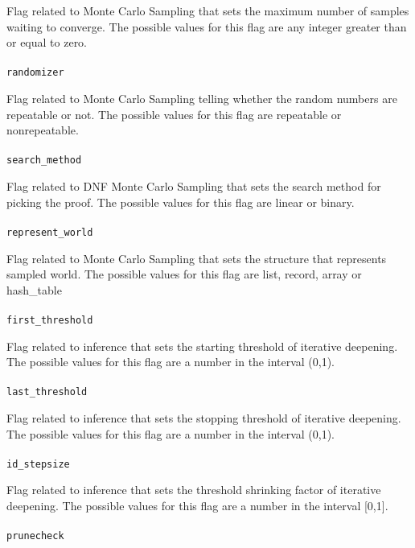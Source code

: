 \documentclass[a4paper,12pt]{article}
\begin{document}
Flag related to Monte Carlo Sampling that sets the maximum number of samples waiting to converge.
The possible values for this flag are any integer greater than or equal to zero.
\paragraph{}
\texttt{randomizer}

Flag related to Monte Carlo Sampling telling whether the random numbers are repeatable or not.
The possible values for this flag are repeatable or nonrepeatable.
\paragraph{}
\texttt{search\_method}

Flag related to DNF Monte Carlo Sampling that sets the search method for picking the proof.
The possible values for this flag are linear or binary.
\paragraph{}
\texttt{represent\_world}

Flag related to Monte Carlo Sampling that sets the structure that represents sampled world.
The possible values for this flag are list, record, array or hash\_table
\paragraph{}
\texttt{first\_threshold}

Flag related to inference that sets the starting threshold of iterative deepening.
The possible values for this flag are a number in the interval (0,1).
\paragraph{}
\texttt{last\_threshold}

Flag related to inference that sets the stopping threshold of iterative deepening.
The possible values for this flag are a number in the interval (0,1).
\paragraph{}
\texttt{id\_stepsize}

Flag related to inference that sets the threshold shrinking factor of iterative deepening.
The possible values for this flag are a number in the interval [0,1].
\paragraph{}
\texttt{prunecheck}
\end{document}
